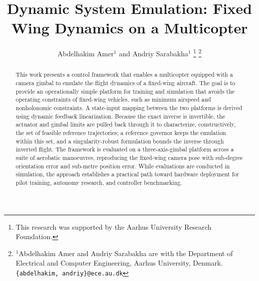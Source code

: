 \documentclass[letterpaper, 10 pt, conference]{ieeeconf}  %
\title{\LARGE \bf
Dynamic System Emulation: Fixed Wing Dynamics on a Multicopter
}
\author{Abdelhakim Amer$^{1}$ and Andriy Sarabakha$^{1}$%
\thanks{This research was supported by the Aarhus University Research Foundation.}
\thanks{$^{1}$Abdelhakim Amer and Andriy Sarabakha are with the Department of Electrical and Computer Engineering, Aarhus University, Denmark. {\tt\small \{abdelhakim, andriy\}@ece.au.dk}}%
}
\begin{document}

\maketitle
\thispagestyle{empty}
\pagestyle{empty}

\begin{abstract}

This work presents a control framework that enables a multicopter equipped with a camera gimbal to emulate the flight dynamics of a fixed-wing aircraft. The goal is to provide an operationally simple platform for training and simulation that avoids the operating constraints of fixed-wing vehicles, such as minimum airspeed and nonholonomic constraints.
A state-input mapping between the two platforms is derived using dynamic feedback linearization. Because the exact inverse is invertible, the actuator and gimbal limits are pulled back through it to characterize, constructively, the set of feasible reference trajectories; a reference governor keeps the emulation within this set, and a singularity-robust formulation bounds the inverse through inverted flight.
The framework is evaluated on a three-axis-gimbal platform across a suite of aerobatic manoeuvres, reproducing the fixed-wing camera pose with sub-degree orientation error and sub-metre position error. While evaluations are conducted in simulation, the approach establishes a practical path toward hardware deployment for pilot training, autonomy research, and controller benchmarking.

\end{abstract}








\end{document}
